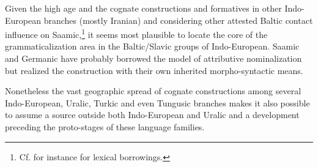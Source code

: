 Given the high age and the cognate constructions and formatives in other Indo-European branches (mostly Iranian) and considering other attested Baltic contact influence on Saamic,\footnote{Cf. for instance \citealt{riesler2009} for lexical borrowings.} it seems most plausible to locate the core of the grammaticalization area in the Baltic\slash{}Slavic groups of Indo-European. Saamic and Germanic have probably borrowed the model of attributive nominalization but realized the construction with their own inherited morpho-syntactic means.

Nonetheless the vast geographic spread of cognate constructions among several Indo-European, Uralic, Turkic and even Tungusic branches makes it also possible to assume a source outside both Indo-European and Uralic and a development preceding the proto-stages of these language families.
